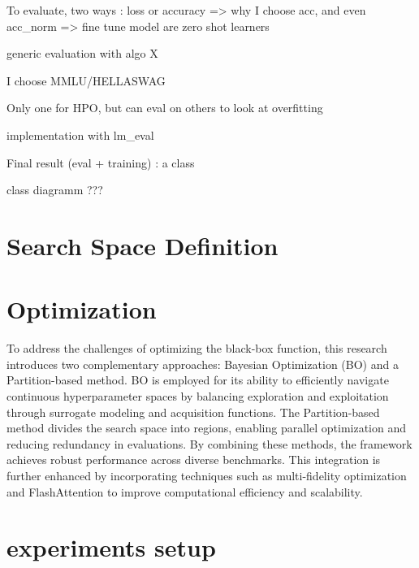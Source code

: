 To evaluate, two ways : loss or accuracy => why I choose acc, and even acc\_norm
=> fine tune model are zero shot learners

generic evaluation with algo X

I choose MMLU/HELLASWAG

Only one for HPO, but can eval on others to look at overfitting

implementation with lm\_eval

Final result (eval + training) : a class 

class diagramm ???

\section{Search Space Definition}
\label{sec:search_space}


\section{Optimization}
\label{sec:opt}
To address the challenges of optimizing the black-box function, this research introduces two complementary approaches: Bayesian Optimization (BO) and a Partition-based method. BO is employed for its ability to efficiently navigate continuous hyperparameter spaces by balancing exploration and exploitation through surrogate modeling and acquisition functions. The Partition-based method divides the search space into regions, enabling parallel optimization and reducing redundancy in evaluations. By combining these methods, the framework achieves robust performance across diverse benchmarks. This integration is further enhanced by incorporating techniques such as multi-fidelity optimization and FlashAttention to improve computational efficiency and scalability.

\section{experiments setup}
\label{sec:exp_setup}


